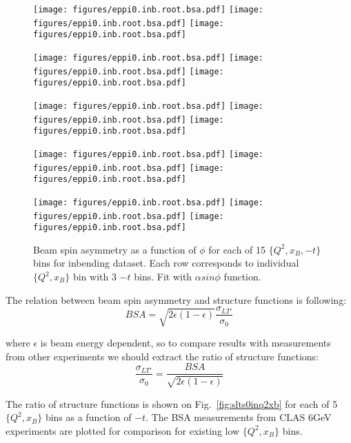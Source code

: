 \begin{figure}[hbt]
	\centering
	\texttt{[image: figures/eppi0.inb.root.bsa.pdf]}
	\texttt{[image: figures/eppi0.inb.root.bsa.pdf]}
	\texttt{[image: figures/eppi0.inb.root.bsa.pdf]}
	
	\texttt{[image: figures/eppi0.inb.root.bsa.pdf]}
	\texttt{[image: figures/eppi0.inb.root.bsa.pdf]}
	\texttt{[image: figures/eppi0.inb.root.bsa.pdf]}
	
	\texttt{[image: figures/eppi0.inb.root.bsa.pdf]}
	\texttt{[image: figures/eppi0.inb.root.bsa.pdf]}
	\texttt{[image: figures/eppi0.inb.root.bsa.pdf]}
	
	\texttt{[image: figures/eppi0.inb.root.bsa.pdf]}
	\texttt{[image: figures/eppi0.inb.root.bsa.pdf]}
	\texttt{[image: figures/eppi0.inb.root.bsa.pdf]}
	
	\texttt{[image: figures/eppi0.inb.root.bsa.pdf]}
	\texttt{[image: figures/eppi0.inb.root.bsa.pdf]}
	\texttt{[image: figures/eppi0.inb.root.bsa.pdf]}
	
	
	\caption{Beam spin asymmetry as a function of $\phi$ for each of 15 $\{Q^2,x_B,-t\}$ bins for inbending dataset. Each row corresponds to individual $\{Q^2,x_B\}$ bin with 3 $-t$ bins. Fit with $\alpha sin\phi$ function.}
	\label{fig:bsaq2xbtt}
\end{figure}


The relation between beam spin asymmetry and structure functions is following:
\begin{equation}
	BSA = \sqrt{2\epsilon(1-\epsilon)}\frac{\sigma_{LT'}}{\sigma_{0}}
\end{equation}

where $\epsilon$ is beam energy dependent, so to compare results with measurements from other experiments we should extract the ratio of structure functions:
\begin{equation}
	\frac{\sigma_{LT'}}{\sigma_{0}} = \frac{BSA}{\sqrt{2\epsilon(1-\epsilon)}}
\end{equation}

The ratio of structure functions is shown on Fig.~\ref{fig:slts0inq2xb} for each of 5 $\{Q^2,x_B\}$ bins as a function of $-t$.
The BSA measurements from CLAS 6GeV experiments are plotted for comparison for existing low $\{Q^2,x_B\}$ bins.

